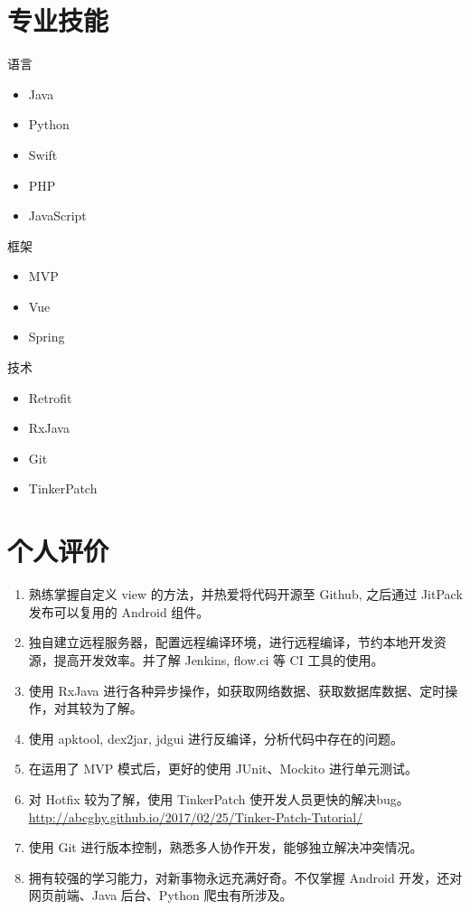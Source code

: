 \documentclass[11pt]{res}
\begin{document}
\begin{resume}
\section{专业技能}
  \begin{multicols}{3}
    语言
    \begin{itemize}
      \item Java
      \item Python
      \item Swift
      \item PHP
      \item JavaScript
    \end{itemize}
    框架
    \begin{itemize}
      \item MVP
      \item Vue
      \item Spring
    \end{itemize}
    技术
    \begin{itemize}
      \item Retrofit
      \item RxJava
      \item Git
      \item TinkerPatch
    \end{itemize}
  \end{multicols}

\section{个人评价}
  \begin{enumerate}
      \item 熟练掌握自定义 view 的方法，并热爱将代码开源至 Github, 之后通过 JitPack 发布可以复用的 Android 组件。
      \item 独自建立远程服务器，配置远程编译环境，进行远程编译，节约本地开发资源，提高开发效率。并了解 Jenkins, flow.ci 等 CI 工具的使用。
      \item 使用 RxJava 进行各种异步操作，如获取网络数据、获取数据库数据、定时操作，对其较为了解。
      \item 使用 apktool, dex2jar, jdgui 进行反编译，分析代码中存在的问题。
      \item 在运用了 MVP 模式后，更好的使用 JUnit、Mockito 进行单元测试。
      \item 对 Hotfix 较为了解，使用 TinkerPatch 使开发人员更快的解决bug。\\ \url{http://abcghy.github.io/2017/02/25/Tinker-Patch-Tutorial/}
      \item 使用 Git 进行版本控制，熟悉多人协作开发，能够独立解决冲突情况。
      \item 拥有较强的学习能力，对新事物永远充满好奇。不仅掌握 Android 开发，还对网页前端、Java 后台、Python 爬虫有所涉及。
  \end{enumerate}

\end{resume}
\end{document}
